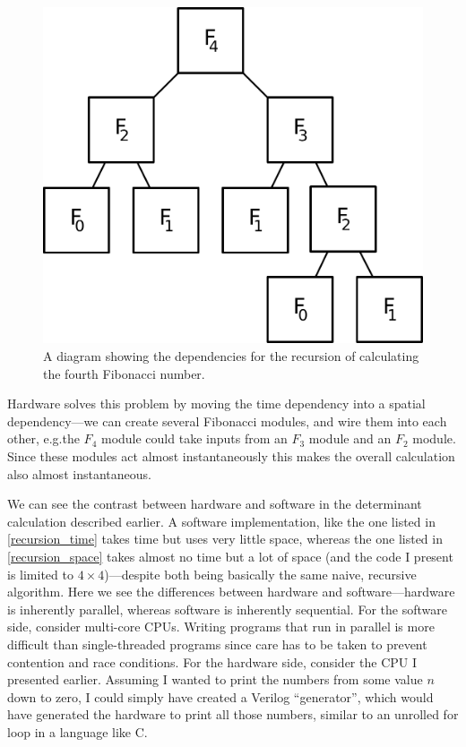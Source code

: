 \documentclass[12pt]{article}
\begin{document}
\begin{figure}[thp]
	\centering
	
	\includegraphics[width=\textwidth]{fib-block.pdf}
	
	\caption{A diagram showing the dependencies for the recursion of calculating the fourth Fibonacci number.}
	\label{fib_block}
\end{figure}

Hardware solves this problem by moving the time dependency into a spatial dependency---we can create several Fibonacci modules, and wire them into each other, e.g.\@ the $F_4$ module could take inputs from an $F_3$ module and an $F_2$ module. Since these modules act almost instantaneously this makes the overall calculation also almost instantaneous.

We can see the contrast between hardware and software in the determinant calculation described earlier. A software implementation, like the one listed in \ref{recursion_time} takes time but uses very little space, whereas the one listed in \ref{recursion_space} takes almost no time but a lot of space (and the code I present is limited to $4\times4$)---despite both being basically the same naive, recursive algorithm. Here we see the differences between hardware and software---hardware is inherently parallel, whereas software is inherently sequential. For the software side, consider multi-core CPUs. Writing programs that run in parallel is more difficult than single-threaded programs since care has to be taken to prevent contention and race conditions. For the hardware side, consider the CPU I presented earlier. Assuming I wanted to print the numbers from some value $n$ down to zero, I could simply have created a Verilog ``generator'', which would have generated the hardware to print all those numbers, similar to an unrolled for loop in a language like C.
\end{document}
